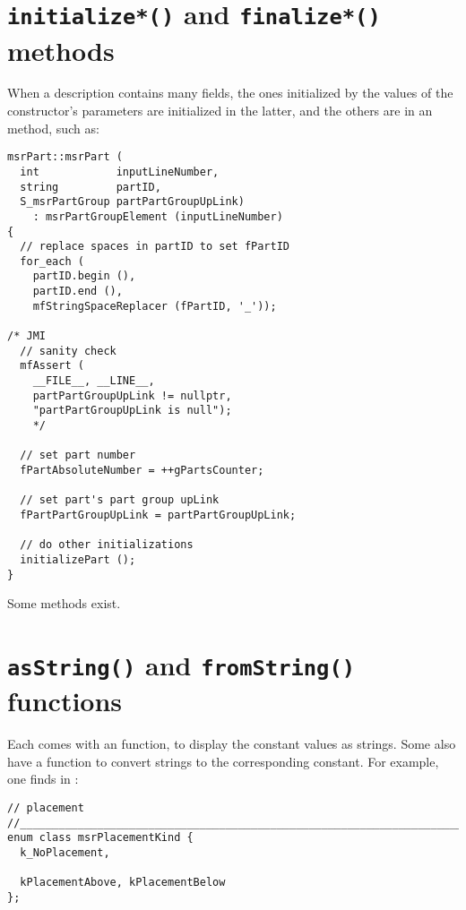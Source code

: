 \section{{\tt initialize*()} and {\tt finalize*()} methods}

When a description contains many fields, the ones initialized by the values of the constructor's parameters are initialized in the latter, and the others are in an  method, such as:
\begin{lstlisting}[language=CPlusPlus]
msrPart::msrPart (
  int            inputLineNumber,
  string         partID,
  S_msrPartGroup partPartGroupUpLink)
    : msrPartGroupElement (inputLineNumber)
{
  // replace spaces in partID to set fPartID
  for_each (
    partID.begin (),
    partID.end (),
    mfStringSpaceReplacer (fPartID, '_'));

/* JMI
  // sanity check
  mfAssert (
    __FILE__, __LINE__,
    partPartGroupUpLink != nullptr,
    "partPartGroupUpLink is null");
    */

  // set part number
  fPartAbsoluteNumber = ++gPartsCounter;

  // set part's part group upLink
  fPartPartGroupUpLink = partPartGroupUpLink;

  // do other initializations
  initializePart ();
}
\end{lstlisting}

Some  methods exist. %


\section{{\tt *asString()} and {\tt *fromString()} functions}

Each \enumType comes with an  function, to display the constant values as strings. Some also have a  function to convert strings to the corresponding constant. For example, one finds in :
\begin{lstlisting}[language=CPlusPlus]
// placement
//______________________________________________________________________________
enum class msrPlacementKind {
  k_NoPlacement,

  kPlacementAbove, kPlacementBelow
};
\end{lstlisting}

